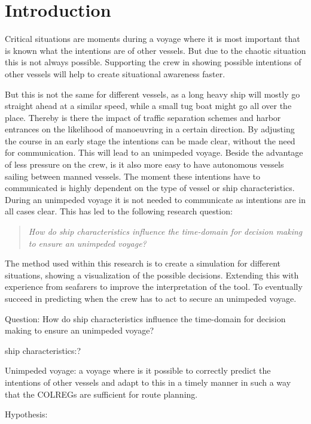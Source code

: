 \chapter*{Introduction}
Critical situations are moments during a voyage where it is most important that is known what the intentions are of other vessels. But due to the chaotic situation this is not always possible. Supporting the crew in showing possible intentions of other vessels will help to create situational awareness faster. 

But this is not the same for different vessels, as a long heavy ship will mostly go straight ahead at a similar speed, while a small tug boat might go all over the place. Thereby is there the impact of traffic separation schemes and harbor entrances on the likelihood of manoeuvring in a certain direction. 
By adjusting the course in an early stage the intentions can be made clear, without the need for communication. This will lead to an unimpeded voyage. Beside the advantage of less pressure on the crew, is it also more easy to have autonomous vessels sailing between manned vessels.
The moment these intentions have to communicated is highly dependent on the type of vessel or ship characteristics. During an unimpeded voyage it is not needed to communicate as intentions are in all cases clear. This has led to the following research question:

\begin{quotation}
	\emph{How do ship characteristics influence the time-domain for decision making to ensure an unimpeded voyage?} 
\end{quotation}

The method used within this research is to create a simulation for different situations, showing a visualization of the possible decisions. Extending this with experience from seafarers to improve the interpretation of the tool. To eventually succeed in predicting when the crew has to act to secure an unimpeded voyage.




Question: How do ship characteristics influence the time-domain for decision making to ensure an unimpeded voyage? 

ship characteristics:?

Unimpeded voyage: a voyage where is it possible to correctly predict the intentions of other vessels and adapt to this in a timely manner in such a way that the COLREGs are sufficient for route planning.



Hypothesis: